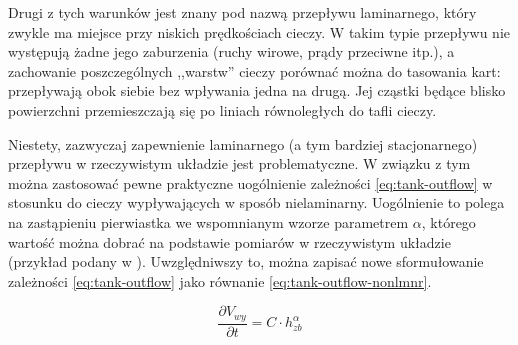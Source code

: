 Drugi z tych warunków jest znany pod nazwą przepływu laminarnego, który zwykle ma miejsce przy niskich prędkościach cieczy. W takim typie przepływu nie występują żadne jego zaburzenia (ruchy wirowe, prądy przeciwne itp.), a zachowanie poszczególnych ,,warstw'' cieczy porównać można do tasowania kart: przepływają obok siebie bez wpływania jedna na drugą. Jej cząstki będące blisko powierzchni przemieszczają się po liniach równoległych do tafli cieczy.

Niestety, zazwyczaj zapewnienie laminarnego (a tym bardziej stacjonarnego) przepływu w rzeczywistym układzie jest problematyczne.
W związku z tym można zastosować pewne praktyczne uogólnienie zależności \ref{eq:tank-outflow} w stosunku do cieczy wypływających w sposób nielaminarny. Uogólnienie to polega na zastąpieniu pierwiastka we wspomnianym wzorze parametrem $\alpha$, którego wartość można dobrać na podstawie pomiarów w rzeczywistym układzie (przykład podany w \cite{TanksManual}). Uwzględniwszy to, można zapisać nowe sformułowanie zależności \ref{eq:tank-outflow} jako równanie \ref{eq:tank-outflow-nonlmnr}.

\begin{equation}\label{eq:tank-outflow-nonlmnr}
    \frac{\partial V_{wy}}{\partial t} = C\cdot h_{zb}^{\alpha}
\end{equation}
